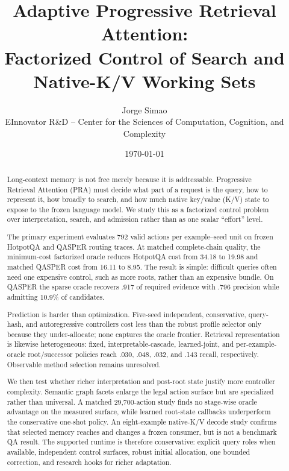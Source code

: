 \documentclass[11pt]{article}
\title{Adaptive Progressive Retrieval Attention:\\
Factorized Control of Search and Native-K/V Working Sets}
\author{Jorge Simao\\EInnovator R\&D -- Center for the Sciences of Computation, Cognition, and Complexity}
\date{\today}
\begin{document}
\maketitle

\begin{abstract}
Long-context memory is not free merely because it is addressable. Progressive Retrieval Attention
(PRA) must decide what part of a request is the query, how to represent it, how broadly to search,
and how much native key/value (K/V) state to expose to the frozen language model. We study this as a
factorized control problem over interpretation, search, and admission rather than as one scalar
``effort'' level.

The primary experiment evaluates 792 valid actions per example--seed unit on frozen HotpotQA and
QASPER routing traces. At matched complete-chain quality, the minimum-cost factorized oracle reduces
HotpotQA cost from 34.18 to 19.98 and matched QASPER cost from 16.11 to 8.95. The result is simple:
difficult queries often need one expensive control, such as more roots, rather than an expensive
bundle. On QASPER the sparse oracle recovers .917 of required evidence with .796 precision while
admitting 10.9\% of candidates.

Prediction is harder than optimization. Five-seed independent, conservative, query-hash, and
autoregressive controllers cost less than the robust profile selector only because they
under-allocate; none captures the oracle frontier. Retrieval representation is likewise
heterogeneous: fixed, interpretable-cascade, learned-joint, and per-example-oracle root/successor
policies reach .030, .048, .032, and .143 recall, respectively. Observable method selection remains
unresolved.

We then test whether richer interpretation and post-root state justify more controller complexity.
Semantic graph facets enlarge the legal action surface but are specialized rather than universal.
A matched 29,700-action study finds no stage-wise oracle advantage on the measured surface, while
learned root-state callbacks underperform the conservative one-shot policy. An eight-example
native-K/V decode study confirms that selected memory reaches and changes a frozen consumer, but is
not a benchmark QA result. The supported runtime is therefore conservative: explicit query roles
when available, independent control surfaces, robust initial allocation, one bounded correction,
and research hooks for richer adaptation.
\end{abstract}
\end{document}
